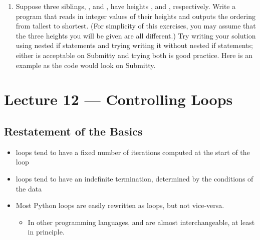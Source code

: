 \documentclass[letterpaper,10pt,english]{sphinxmanual}
\begin{document}
\begin{enumerate}
\item {} 
Suppose three siblings, ,  and , have
heights ,  and , respectively.  Write a program
that reads in integer values of their heights and outputs
the ordering from tallest to shortest.  (For simplicity of
this exercises, you may assume that the three heights you will be
given are all different.)  Try writing your solution using nested
if statements and trying writing it without nested if statements;
either is acceptable on Submitty and trying both is good practice.
Here is an example as the code would look on Submitty.

%
\begin{sphinxVerbatim}[commandchars=\\\{\}]
 
 
 
\end{sphinxVerbatim}

\end{enumerate}


\chapter{Lecture 12 — Controlling Loops}
\label{\detokenize{lecture_notes/lec12_loops2_for_double:lecture-12-controlling-loops}}\label{\detokenize{lecture_notes/lec12_loops2_for_double::doc}}

\section{Restatement of the Basics}
\label{\detokenize{lecture_notes/lec12_loops2_for_double:restatement-of-the-basics}}\begin{itemize}
\item {} 
 loops tend to have a fixed number of iterations computed at
the start of the loop

\item {} 
 loops tend to have an indefinite termination, determined by
the conditions of the data

\item {} 
Most Python  loops are easily rewritten as  loops,
but not vice-versa.
\begin{itemize}
\item {} 
In other programming languages,  and  are almost
interchangeable, at least in principle.

\end{itemize}

\end{itemize}
\end{document}
